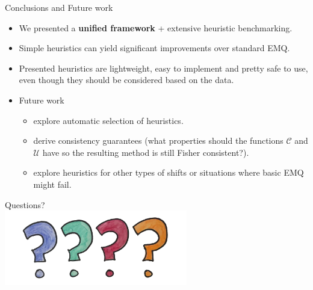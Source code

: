 \documentclass[aspectratio=169]{beamer}
\begin{document}
\begin{frame}{Conclusions and Future work}
  \begin{itemize}
    \item We presented a \textbf{unified framework} + extensive heuristic benchmarking.
    \item Simple heuristics can yield significant improvements over standard EMQ.
    \item Presented heuristics are lightweight, easy to implement and pretty safe to use, even though they should be considered based on the data.
    \item Future work
    \begin{itemize} 
      \item explore automatic selection of heuristics.
      \item derive consistency guarantees (what properties should the functions $\mathcal{C}$ and $\mathcal{U}$ have so the resulting method is still Fisher consistent?).
      \item explore heuristics for other types of shifts or situations where basic EMQ might fail.
    \end{itemize}
  \end{itemize}
\end{frame}

\begin{frame}
  \centering
  \Huge
Questions?
\\ 
\vspace{1cm}
\includegraphics[width=0.6\textwidth]{images/questions.png}
\end{frame}
\end{document}
